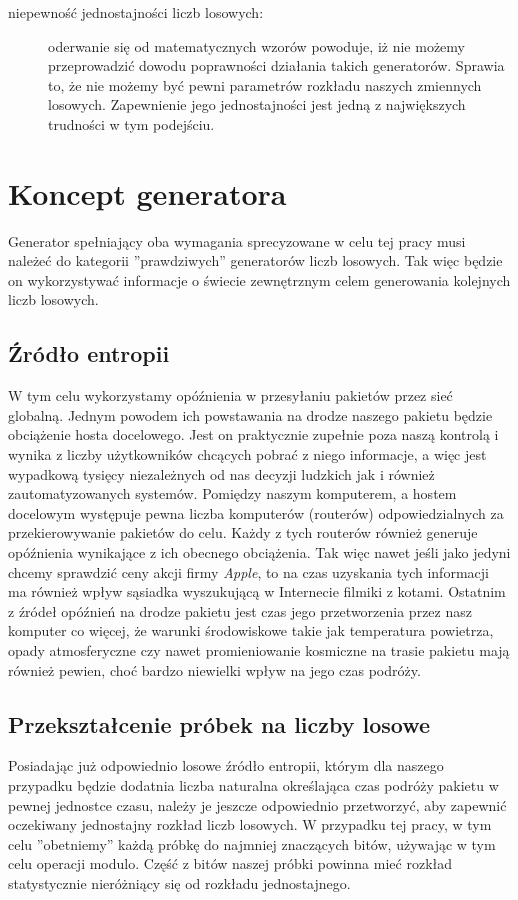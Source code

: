 \begin{description}
\item[niepewność jednostajności liczb losowych:] oderwanie się od matematycznych wzorów powoduje, iż nie możemy przeprowadzić dowodu poprawności działania takich generatorów. Sprawia to, że nie możemy być pewni parametrów rozkładu naszych zmiennych losowych. Zapewnienie jego jednostajności jest jedną z największych trudności w tym podejściu.
\end{description}

\section{Koncept generatora}
Generator spełniający oba wymagania sprecyzowane w celu tej pracy musi należeć do kategorii ''prawdziwych'' generatorów liczb losowych. Tak więc będzie on wykorzystywać informacje o świecie zewnętrznym celem generowania kolejnych liczb losowych.
\subsection{Źródło entropii}
W tym celu wykorzystamy opóźnienia w przesyłaniu pakietów przez sieć globalną. Jednym powodem ich powstawania na drodze naszego pakietu będzie obciążenie hosta docelowego. Jest on praktycznie zupełnie poza naszą kontrolą i wynika z liczby użytkowników chcących pobrać z niego informacje, a więc jest wypadkową tysięcy niezależnych od nas decyzji ludzkich jak i również zautomatyzowanych systemów. Pomiędzy naszym komputerem, a hostem docelowym występuje pewna liczba komputerów (routerów) odpowiedzialnych za przekierowywanie pakietów do celu. Każdy z tych routerów również generuje opóźnienia wynikające z ich obecnego obciążenia. Tak więc nawet jeśli jako jedyni chcemy sprawdzić ceny akcji firmy \emph{Apple}, to na czas uzyskania tych informacji ma również wpływ sąsiadka wyszukującą w Internecie filmiki z kotami. Ostatnim z źródeł opóźnień na drodze pakietu jest czas jego przetworzenia przez nasz komputer co więcej, że warunki środowiskowe takie jak temperatura powietrza, opady atmosferyczne czy nawet promieniowanie kosmiczne na trasie pakietu mają również pewien, choć bardzo niewielki wpływ na jego czas podróży.  
\subsection{Przekształcenie próbek na liczby losowe}
Posiadając już odpowiednio losowe źródło entropii, którym dla naszego przypadku będzie dodatnia liczba naturalna określająca czas podróży pakietu w pewnej jednostce czasu, należy je jeszcze odpowiednio przetworzyć, aby zapewnić oczekiwany jednostajny rozkład liczb losowych. W przypadku tej pracy, w tym celu ''obetniemy'' każdą próbkę do najmniej znaczących bitów, używając w tym celu operacji modulo. Część z bitów naszej próbki powinna mieć rozkład statystycznie nieróżniący się od rozkładu jednostajnego.

